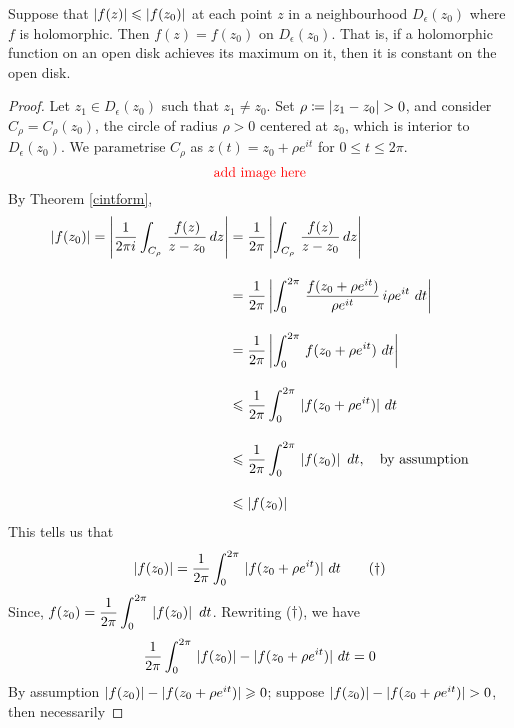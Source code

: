 \vspace*{1em}

\begin{lemma}
Suppose that $\left\lvert f(z)\right\rvert \leqslant \left\lvert f(z_0)\right\rvert$ at each point $z$ in a neighbourhood $D_\epsilon(z_0)$ where $f$ is holomorphic. Then $f(z) = f(z_0)$ on $D_\epsilon(z_0)$. That is, if a holomorphic function on an open disk achieves its maximum on it, then it is constant on the open disk.
\end{lemma}
\begin{proof}
Let $z_1 \in D_\epsilon(z_0)$ such that $z_1 \neq z_0$. Set $\rho \coloneqq \left\lvert z_1 - z_0\right\rvert > 0$, and consider $C_\rho = C_\rho(z_0)$, the circle of radius $\rho > 0$ centered at $z_0$, which is interior to $D_\epsilon(z_0)$. We parametrise $C_\rho$ as $z(t) = z_0 + \rho e^{it}$ for $0 \leq t \leq 2\pi$.
\[
\text{\color{red}add image here}
\]
By Theorem \ref{cintform},
\begin{align*}
\left\lvert f(z_0)\right\rvert = \left\lvert\frac{1}{2\pi i}\int_{C_\rho}\,\frac{f(z)}{z - z_0}\, dz\right\rvert &= \frac{1}{2\pi}\left\lvert\int_{C_\rho}\,\frac{f(z)}{z - z_0}\, dz\right\rvert\\[1em]
 &= \frac{1}{2\pi}\left\lvert\int_0^{2\pi}\,\frac{f(z_0 + \rho e^{it})}{\rho e^{it}}\,i\rho e^{it}\ dt\right\rvert\\[1em]
 &= \frac{1}{2\pi}\left\lvert\int_0^{2\pi}\,f(z_0 + \rho e^{it})\ dt\right\rvert\\[1em]
 &\leqslant \frac{1}{2\pi}\int_0^{2\pi}\,|f(z_0 + \rho e^{it})|\ dt\\[1em]
 &\leqslant \frac{1}{2\pi}\int_0^{2\pi}\,\left\lvert f(z_0)\right\rvert\ dt,\quad \text{by assumption}\\[1em]
 &\leqslant \left\lvert f(z_0)\right\rvert
\end{align*} 
This tells us that
\[\left\lvert f(z_0)\right\rvert = \frac{1}{2\pi}\int_0^{2\pi}\,|f(z_0 + \rho e^{it})|\ dt \tag{$\dagger$}\]
Since, $\displaystyle f(z_0) =  \frac{1}{2\pi}\int_0^{2\pi}\,\left\lvert f(z_0)\right\rvert\ dt$. Rewriting ($\dagger$), we have
\[\frac{1}{2\pi}\int_0^{2\pi}\, \left\lvert f(z_0)\right\rvert - |f(z_0 + \rho e^{it})|\ dt = 0\]
By assumption $\left\lvert f(z_0)\right\rvert - |f(z_0 + \rho e^{it})| \geqslant 0$; suppose $\left\lvert f(z_0)\right\rvert - |f(z_0 + \rho e^{it})| > 0$, then necessarily 

\end{proof}

